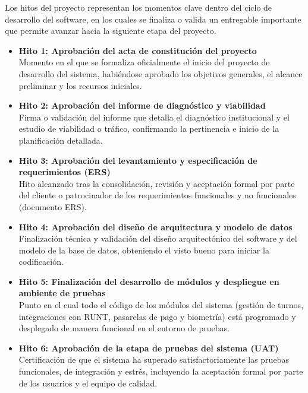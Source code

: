 Los hitos del proyecto representan los momentos clave dentro del ciclo de desarrollo del software, en los cuales se finaliza o valida un entregable importante que permite avanzar hacia la siguiente etapa del proyecto.

\begin{itemize}

\item \textbf{Hito 1: Aprobación del acta de constitución del proyecto} \\
Momento en el que se formaliza oficialmente el inicio del proyecto de desarrollo del sistema, habiéndose aprobado los objetivos generales, el alcance preliminar y los recursos iniciales.

\item \textbf{Hito 2: Aprobación del informe de diagnóstico y viabilidad} \\
Firma o validación del informe que detalla el diagnóstico institucional y el estudio de viabilidad o tráfico, confirmando la pertinencia e inicio de la planificación detallada.

\item \textbf{Hito 3: Aprobación del levantamiento y especificación de requerimientos (ERS)} \\
Hito alcanzado tras la consolidación, revisión y aceptación formal por parte del cliente o patrocinador de los requerimientos funcionales y no funcionales (documento ERS).

\item \textbf{Hito 4: Aprobación del diseño de arquitectura y modelo de datos} \\
Finalización técnica y validación del diseño arquitectónico del software y del modelo de la base de datos, obteniendo el visto bueno para iniciar la codificación.

\item \textbf{Hito 5: Finalización del desarrollo de módulos y despliegue en ambiente de pruebas} \\
Punto en el cual todo el código de los módulos del sistema (gestión de turnos, integraciones con RUNT, pasarelas de pago y biometría) está programado y desplegado de manera funcional en el entorno de pruebas.

\item \textbf{Hito 6: Aprobación de la etapa de pruebas del sistema (UAT)} \\
Certificación de que el sistema ha superado satisfactoriamente las pruebas funcionales, de integración y estrés, incluyendo la aceptación formal por parte de los usuarios y el equipo de calidad.


\end{itemize}
